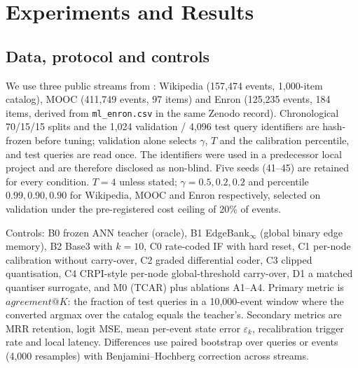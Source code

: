 \documentclass[preprint,12pt]{elsarticle}
\begin{document}
\section{Experiments and Results}
\label{sec:results}

\subsection{Data, protocol and controls}

We use three public streams from \cite{poursafaei2022dataset}: Wikipedia (157,474 events, 1,000-item catalog), MOOC (411,749 events, 97 items) and Enron (125,235 events, 184 items, derived from \texttt{ml\_enron.csv} in the same Zenodo record). Chronological 70/15/15 splits and the 1,024 validation / 4,096 test query identifiers are hash-frozen before tuning; validation alone selects $\gamma$, $T$ and the calibration percentile, and test queries are read once. The identifiers were used in a predecessor local project and are therefore disclosed as non-blind. Five seeds (41--45) are retained for every condition. $T=4$ unless stated; $\gamma=0.5,0.2,0.2$ and percentile $0.99,0.90,0.90$ for Wikipedia, MOOC and Enron respectively, selected on validation under the pre-registered cost ceiling of 20\% of events.

Controls: B0 frozen ANN teacher (oracle), B1 EdgeBank$_\infty$ (global binary edge memory), B2 Base3 with $k=10$, C0 rate-coded IF with hard reset, C1 per-node calibration without carry-over, C2 graded differential coder, C3 clipped quantisation, C4 CRPI-style per-node global-threshold carry-over, D1 a matched quantiser surrogate, and M0 (TCAR) plus ablations A1--A4. Primary metric is $\mathit{agreement@}K$: the fraction of test queries in a 10,000-event window where the converted argmax over the catalog equals the teacher's. Secondary metrics are MRR retention, logit MSE, mean per-event state error $\varepsilon_k$, recalibration trigger rate and local latency. Differences use paired bootstrap over queries or events (4,000 resamples) with Benjamini--Hochberg correction across streams.
\end{document}
